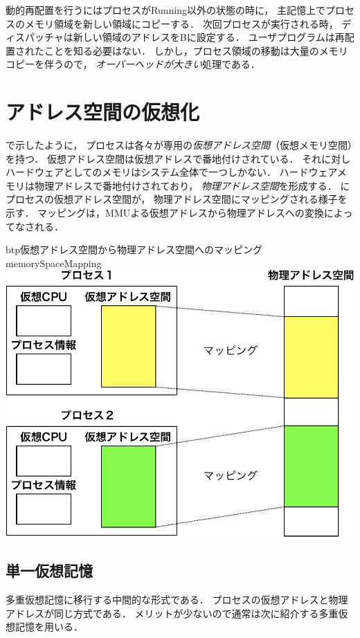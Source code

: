 動的再配置を行うにはプロセスがRunning以外の状態の時に，
主記憶上でプロセスのメモリ領域を新しい領域にコピーする．
次回プロセスが実行される時，
ディスパッチャは新しい領域のアドレスをBに設定する．
ユーザプログラムは再配置されたことを知る必要はない．
しかし，プロセス領域の移動は大量のメモリコピーを伴うので，
\emph{オーバーヘッドが大きい}処理である．

\section{アドレス空間の仮想化}
で示したように，
プロセスは各々が専用の\emph{仮想アドレス空間}（仮想メモリ空間）を持つ．
仮想アドレス空間は仮想アドレスで番地付けされている．
それに対しハードウェアとしてのメモリはシステム全体で一つしかない．
ハードウェアメモリは物理アドレスで番地付けされており，
\emph{物理アドレス空間}を形成する．
にプロセスの仮想アドレス空間が，
物理アドレス空間にマッピングされる様子を示す．
マッピングは，MMUよる仮想アドレスから物理アドレスへの変換によってなされる．

\begin{myfig}{btp}{仮想アドレス空間から物理アドレス空間へのマッピング}
  {memorySpaceMapping}
  \includegraphics[scale=0.60]{Fig/memorySpaceMapping-crop.pdf}
\end{myfig}

\subsection{単一仮想記憶}
多重仮想記憶に移行する中間的な形式である．
プロセスの仮想アドレスと物理アドレスが同じ方式である．
メリットが少ないので通常は次に紹介する多重仮想記憶を用いる．

